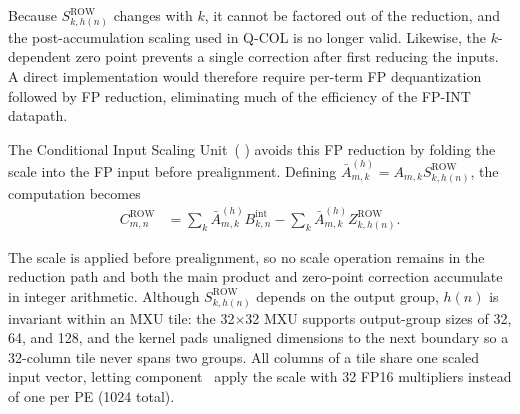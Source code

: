 \documentclass[sigconf,anonymous,nonacm]{acmart}
\newcommand{\fpint}{FP-INT}
\newcommand{\qcol}{Q-COL}
\newcommand{\blackcircletext}[1]{%
  \tikz[baseline=-0.5ex]{
    \node[
      circle,
      fill=black,
      text=white,
      inner sep=0pt,
      minimum size=7pt,
      font=\fontsize{5}{5}\selectfont\bfseries
    ] (char) {#1};
  }%
}
\begin{document}
Because $S^{\mathrm{ROW}}_{k,h(n)}$ changes with $k$, it cannot be factored out of the reduction, and the post-accumulation scaling used in \qcol{} is no longer valid. Likewise, the $k$-dependent zero point prevents a single correction after first reducing the inputs. A direct implementation would therefore require per-term FP dequantization followed by FP reduction, eliminating much of the efficiency of the \fpint{} datapath.

The Conditional Input Scaling Unit~(\blackcircletext{1}) avoids this FP reduction by folding the scale into the FP input before prealignment. Defining $\bar{A}^{(h)}_{m,k}=A_{m,k}S^{\mathrm{ROW}}_{k,h(n)}$, the computation becomes
\begin{align}
    C^{\mathrm{ROW}}_{m,n}
    &=
    \sum_k \bar{A}^{(h)}_{m,k}B^{\mathrm{int}}_{k,n}
    -
    \sum_k \bar{A}^{(h)}_{m,k}Z^{\mathrm{ROW}}_{k,h(n)}.
    \label{eq:qrow-fpint}
\end{align}


The scale is applied before prealignment, so no scale operation remains in the reduction path and both the main product and zero-point correction accumulate in integer arithmetic. Although $S^{\mathrm{ROW}}_{k,h(n)}$ depends on the output group, $h(n)$ is invariant within an MXU tile: the 32$\times$32 MXU supports output-group sizes of 32, 64, and 128, and the kernel pads unaligned dimensions to the next boundary so a 32-column tile never spans two groups. All columns of a tile share one scaled input vector, letting component~\blackcircletext{1} apply the scale with 32 FP16 multipliers instead of one per PE (1024 total).
\end{document}
